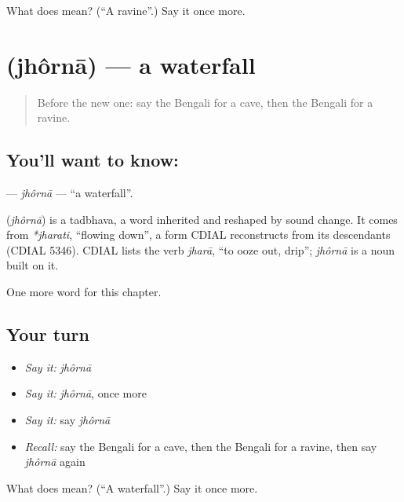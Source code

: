 \begin{tcolorbox}[breakable,colback=teal!4,colframe=teal!35!black,title={Before you move on}]
What does  mean? (\textquotedblleft{}A ravine\textquotedblright{}.) Say it once more.
\end{tcolorbox}
\section[\texorpdfstring{\bn{ঝরনা} (jhôrnā)}{ঝরনা (jhôrnā)}]{ (jhôrnā) — a waterfall}

\label{lesson:BN-C189-jhorna}



\begin{quote}
Before the new one: say the Bengali for a cave, then the Bengali for a ravine.
\end{quote}

\subsection*{You'll want to know: }
\textbf{} — \emph{jhôrnā} — \textquotedblleft{}a waterfall\textquotedblright{}.

\begin{cousinweb}
\textbf{} (\emph{jhôrnā}) is a tadbhava, a word inherited and reshaped by sound change. It comes from \emph{*jharati}, \textquotedblleft{}flowing down\textquotedblright{}, a form CDIAL reconstructs from its descendants (CDIAL 5346). CDIAL lists the verb \emph{jharā}, \textquotedblleft{}to ooze out, drip\textquotedblright{}; \emph{jhôrnā} is a noun built on it.
\end{cousinweb}

\begin{grammarlens}[title={What you've built}]
One more word for this chapter.
\end{grammarlens}

\subsection*{Your turn}
\begin{itemize}
\raggedright
  \item \emph{Say it:} \emph{jhôrnā}
  \item \emph{Say it:} \emph{jhôrnā}, once more
  \item \emph{Say it:} say \emph{jhôrnā}
  \item \emph{Recall:} say the Bengali for a cave, then the Bengali for a ravine, then say \emph{jhôrnā} again
\end{itemize}

\begin{tcolorbox}[breakable,colback=teal!4,colframe=teal!35!black,title={Before you move on}]
What does  mean? (\textquotedblleft{}A waterfall\textquotedblright{}.) Say it once more.
\end{tcolorbox}
